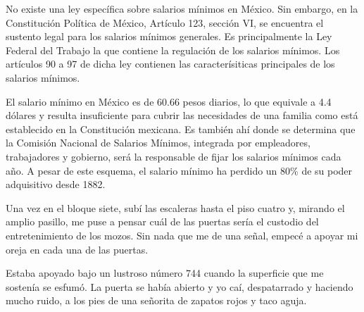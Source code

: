 \documentclass[12pt,twoside,openright,a5paper]{book}
\begin{document}
No existe una ley específica sobre salarios mínimos en México. Sin
embargo, en la Constitución Política de México, Artículo 123, sección
VI, se encuentra el sustento legal para los salarios mínimos generales. Es
principalmente  la Ley Federal del Trabajo la que contiene la regulación
de los salarios mínimos. Los artículos 90 a 97 de dicha ley contienen
las caracterísiticas principales de los salarios mínimos.

El salario mínimo en México es de 60.66 pesos diarios, lo que equivale
a 4.4 dólares y resulta insuficiente para cubrir las necesidades de una
familia como está establecido en la Constitución mexicana. Es también
ahí donde se determina que la Comisión Nacional de Salarios Mínimos,
integrada por empleadores, trabajadores y gobierno, será la responsable de
fijar los salarios mínimos cada año. A pesar de este esquema, el salario
mínimo ha perdido un 80\% de su poder adquisitivo desde 1882.



\vspace{0.5cm}
\hrulefill\hspace{0.2cm} \decofourleft\decofourright \hspace{0.2cm} \hrulefill
\vspace{0.5cm}

Una vez en el bloque siete, subí las escaleras hasta el piso cuatro y,
mirando el amplio pasillo, me puse a pensar cuál de las puertas sería el
custodio del entretenimiento de los mozos. Sin nada que me de una señal,
empecé a apoyar mi oreja en cada una de las puertas.

Estaba apoyado bajo un lustroso número 744 cuando la superficie que me
sostenía se esfumó. La puerta se había abierto y yo caí, despatarrado
y haciendo mucho ruido, a los pies de una señorita de zapatos rojos y
taco aguja.


\vspace{0.5cm}
\hrulefill\hspace{0.2cm} \decofourleft\decofourright \hspace{0.2cm} \hrulefill
\vspace{0.5cm}
\end{document}
